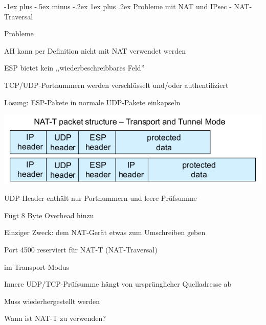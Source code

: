 \documentclass[a4paper]{article}
\makeatletter
\renewcommand{\subsubsection}{\@startsection{subsubsection}{3}{0mm}%
 {-1ex plus -.5ex minus -.2ex}%
 {1ex plus .2ex}%
 {\normalfont\small\bfseries}}
\makeatother
\begin{document}
\begin{multicols}{3}
      \subsubsection{Probleme mit NAT und IPsec - NAT-Traversal}
      \begin{itemize*}
            \item Probleme
            \begin{itemize*}
                  \item AH kann per Definition nicht mit NAT verwendet werden
                  \item ESP bietet kein ,,wiederbeschreibbares Feld'' %
                  \item TCP/UDP-Portnummern werden verschlüsselt und/oder authentifiziert
            \end{itemize*}
            \item Lösung: ESP-Pakete in normale UDP-Pakete einkapseln
            \item \includegraphics[width=.6\linewidth]{Assets/NetworkSecurity-NAT-encap-ESP.png}
            \item UDP-Header enthält nur Portnummern und leere Prüfsumme
            \begin{itemize*}
                  \item Fügt 8 Byte Overhead hinzu
                  \item Einziger Zweck: dem NAT-Gerät etwas zum Umschreiben geben %
                  \item Port 4500 reserviert für NAT-T (NAT-Traversal)
            \end{itemize*}
            \item im Transport-Modus
            \begin{itemize*}
                  \item Innere UDP/TCP-Prüfsumme hängt von ursprünglicher Quelladresse ab %
                  \item Muss wiederhergestellt werden
            \end{itemize*}
            \item Wann ist NAT-T zu verwenden?

\end{itemize*}
\end{multicols}
\end{document}
